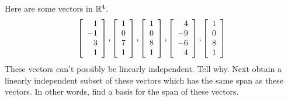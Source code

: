 \begin{enumialphparenastyle}
\begin{ex} Here are some vectors in $\mathbb{R}^{4}$. 
\begin{equation*}
\left[ 
\begin{array}{r}
1 \\ 
-1 \\ 
3 \\ 
1
\end{array}
\right] ,\left[ 
\begin{array}{r}
1 \\ 
0 \\ 
7 \\ 
1
\end{array}
\right] ,\left[ 
\begin{array}{r}
1 \\ 
0 \\ 
8 \\ 
1
\end{array}
\right] ,\left[ 
\begin{array}{r}
4 \\ 
-9 \\ 
-6 \\ 
4
\end{array}
\right] ,\left[ 
\begin{array}{r}
1 \\ 
0 \\ 
8 \\ 
1
\end{array}
\right]
\end{equation*}
These vectors can't possibly be linearly independent. Tell why. Next obtain a
linearly independent subset of these vectors which has the same span as
these vectors. In other words, find a basis for the span of these vectors.
\end{ex}


\end{enumialphparenastyle}
